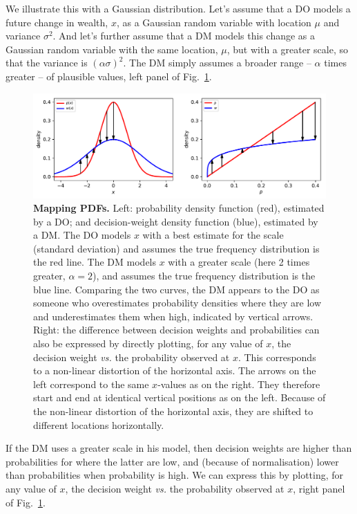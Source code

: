 \documentclass[a4paper, 12pt]{article}
\newcommand{\flabel}[1]{\label{fig:#1}}
\newcommand{\fref}[1]{Fig.~\ref{fig:#1}}
\newcommand{\vs}{\textit{vs.}\xspace}
\begin{document}
We illustrate this with a Gaussian distribution.
Let's assume that a DO models a future change in wealth, $x$, as a Gaussian random variable with location $\mu$ and variance $\sigma^2$. And let's further assume that a DM models this change as a Gaussian random variable with the same location, $\mu$, but with a greater scale, so that the variance is $(\alpha\sigma)^2$. The DM simply assumes a broader range -- $\alpha$ times greater -- of plausible values, left panel of \fref{mapping_pdfs}.
\begin{figure}[!htb]
\centering
\includegraphics[width=\textwidth]{./figs/mapping_pdfs.pdf}
\caption{\textbf{Mapping PDFs.} Left: probability density function (red), estimated by a DO; and decision-weight density function (blue), estimated by a DM. The DO models $x$ with a best estimate for the scale (standard deviation) and assumes the true frequency distribution is the red line. The DM models $x$ with a greater scale (here 2 times greater, $\alpha=2$), and assumes the true frequency distribution is the blue line. Comparing the two curves, the DM appears to the DO as someone who overestimates probability densities where they are low and underestimates them when high, indicated by vertical arrows.
Right: the difference between decision weights and probabilities can also be expressed by directly plotting, for any value of $x$, the decision weight \vs the probability observed at $x$. This corresponds to a non-linear distortion of the horizontal axis. The arrows on the left correspond to the same $x$-values as on the right. They therefore start and end at identical vertical positions as on the left. Because of the non-linear distortion of the horizontal axis, they are shifted to different locations horizontally.}
\flabel{mapping_pdfs}
\end{figure}

If the DM uses a greater scale in his model, then decision weights are higher than probabilities for 
where the latter are low, and (because of normalisation) lower than probabilities when probability is high. We can express this by plotting, for any value of $x$, the decision weight \vs the probability observed at $x$, right panel of \fref{mapping_pdfs}.
\end{document}
